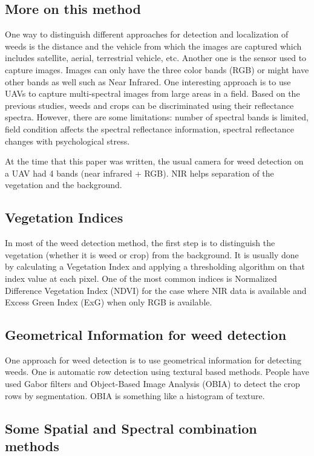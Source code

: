 \documentclass{article}
\begin{document}
	\subsection{More on this method}
	
	One way to distinguish different approaches for detection and localization of weeds is the distance and the vehicle from which the images are captured which includes satellite, aerial, terrestrial vehicle, etc. Another one is the sensor used to capture images. Images can only have the three color bands (RGB) or might have other bands as well such as Near Infrared. One interesting approach is to use UAVs to capture multi-spectral images from large areas in a field. Based on the previous studies, weeds and crops can be discriminated using their reflectance spectra. However, there are some limitations: number of spectral bands is limited, field condition affects the spectral reflectance information, spectral reflectance changes with psychological stress. 
	
	At the time that this paper was written, the usual camera for weed detection on a UAV had 4 bands (near infrared + RGB). NIR helps separation of the vegetation and the background. 
	
	\subsection{Vegetation Indices}
	
	In most of the weed detection method, the first step is to distinguish the vegetation (whether it is weed or crop) from the background. It is usually done by calculating a Vegetation Index and applying a thresholding algorithm on that index value at each pixel. One of the most common indices is Normalized Difference Vegetation Index (NDVI) for the case where NIR data is available and Excess Green Index (ExG) when only RGB is available. 
	
	\subsection{Geometrical Information for weed detection}
	
	One approach for weed detection is to use geometrical information for detecting weeds. One is automatic row detection using textural based methods. People have used Gabor filters and Object-Based Image Analysis (OBIA) to detect the crop rows by segmentation. OBIA is something like a histogram of texture. 
	
	\subsection{Some Spatial and Spectral combination methods}
	
\end{document}
